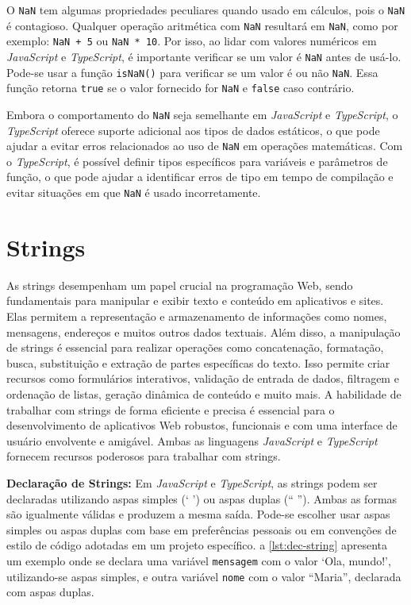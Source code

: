 O \texttt{NaN} tem algumas propriedades peculiares quando usado em cálculos, pois o \texttt{NaN} é contagioso. Qualquer operação aritmética com \texttt{NaN} resultará em \texttt{NaN}, como por exemplo: \texttt{NaN + 5} ou \texttt{NaN * 10}. Por isso, ao lidar com valores numéricos em \textit{JavaScript} e \textit{TypeScript}, é importante verificar se um valor é \texttt{NaN} antes de usá-lo. Pode-se usar a função \texttt{isNaN()} para verificar se um valor é ou não \texttt{NaN}. Essa função retorna \texttt{true} se o valor fornecido for \texttt{NaN} e \texttt{false} caso contrário.

Embora o comportamento do \texttt{NaN} seja semelhante em \textit{JavaScript} e \textit{TypeScript}, o \textit{TypeScript} oferece suporte adicional aos tipos de dados estáticos, o que pode ajudar a evitar erros relacionados ao uso de \texttt{NaN} em operações matemáticas. Com o \textit{TypeScript}, é possível definir tipos específicos para variáveis e parâmetros de função, o que pode ajudar a identificar erros de tipo em tempo de compilação e evitar situações em que \texttt{NaN} é usado incorretamente.




\section{Strings}
\label{JS_string}

As strings desempenham um papel crucial na programação Web, sendo fundamentais para manipular e exibir texto e conteúdo em aplicativos e sites. Elas permitem a representação e armazenamento de informações como nomes, mensagens, endereços e muitos outros dados textuais. Além disso, a manipulação de strings é essencial para realizar operações como concatenação, formatação, busca, substituição e extração de partes específicas do texto. Isso permite criar recursos como formulários interativos, validação de entrada de dados, filtragem e ordenação de listas, geração dinâmica de conteúdo e muito mais. A habilidade de trabalhar com strings de forma eficiente e precisa é essencial para o desenvolvimento de aplicativos Web robustos, funcionais e com uma interface de usuário envolvente e amigável. Ambas as linguagens \textit{JavaScript} e \textit{TypeScript} fornecem recursos poderosos para trabalhar com strings.

\textbf{Declaração de Strings:} Em \textit{JavaScript} e \textit{TypeScript}, as strings podem ser declaradas utilizando aspas simples (` ') ou aspas duplas (`` ''). Ambas as formas são igualmente válidas e produzem a mesma saída. Pode-se escolher usar aspas simples ou aspas duplas com base em preferências pessoais ou em convenções de estilo de código adotadas em um projeto específico. a \autoref{lst:dec-string} apresenta um exemplo onde se declara uma variável \texttt{mensagem} com o valor `Ola, mundo!', utilizando-se aspas simples, e outra variável \texttt{nome} com o valor ``Maria'', declarada com aspas duplas.

